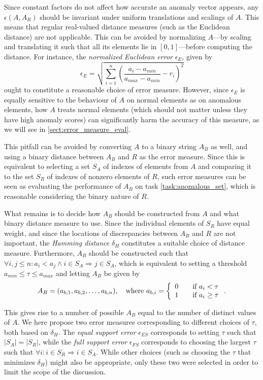 Since constant factors do not affect how accurate an anomaly vector appears, any $\epsilon(A, A_R)$ should be invariant under uniform translations and scalings of $A$. This means that regular real-valued distance measures (such as the Euclidean distance) are not applicable. This can be avoided by normalizing $A$---by scaling and translating it such that all its elements lie in $[0,1]$---before computing the distance. For instance, the \emph{normalized Euclidean error} $\epsilon_E$, given by
\[
  \epsilon_E = \sqrt{\sum_{i=1}^n (\frac{a_i-a_{min}}{a_{max}-a_{min}} - r_i)^2}
\]
ought to constitute a reasonable choice of error measure. However, since $\epsilon_E$ is equally sensitive to the behaviour of $A$ on normal elements as on anomalous elements, how $A$ treats normal elements (which should not matter unless they have high anomaly scores) can significantly harm the accuracy of this measure, as we will see in \ref{sect:error_measure_eval}. 

This pitfall can be avoided by converting $A$ to a binary string $A_B$ as well, and using a binary distance between $A_B$ and $R$ as the error measure. Since this is equivalent to selecting a set $S_A$ of indexes of elements from $A$ and comparing it to the set $S_R$ of indexes of nonzero elements of $R$, such error measures can be seen as evaluating the performance of $A_B$ on task \ref{task:anomalous_set}, which is reasonable considering the binary nature of $R$.

What remains is to decide how $A_B$ should be constructed from $A$ and what binary distance measure to use. Since the individual elements of $S_R$ have equal weight, and since the locations of discrepancies between $A_B$ and $R$ are not important, the \emph{Hamming distance} $\delta_H$ constitutes a suitable choice of distance measure. Furthermore, $A_B$ should be constructed such that $\forall i, j \leq n: a_i < a_j \wedge i \in S_A \Rightarrow j \in S_A$, which is equivalent to setting a threshold $a_{min} \leq \tau \leq a_{max}$ and letting $A_B$ be given by 
\[
    A_B = (a_{b,1}, a_{b,2}, \dots, a_{b,n}), \quad \text{where } a_{b,i} = \left\{ 
    \begin{array}{l l}
        0 & \quad \text{if } a_i < \tau \\
        1 & \quad \text{if } a_i \geq \tau
    \end{array} \right..
\]

This gives rise to a number of possible $A_B$ equal to the number of distinct values of $A$. We here propose two error measures corresponding to different choices of $\tau$, both based on $\delta_H$. The \emph{equal support error} $\epsilon_{ES}$ corresponds to setting $\tau$ such that $|S_A| = |S_R|$, while the \emph{full support error} $\epsilon_{FS}$ corresponds to choosing the largest $\tau$ such that $\forall i: i \in S_R \Rightarrow i \in S_A$. While other choices (such as choosing the $\tau$ that minimizes $\delta_H$) might also be appropriate, only these two were selected in order to limit the scope of the discussion.

